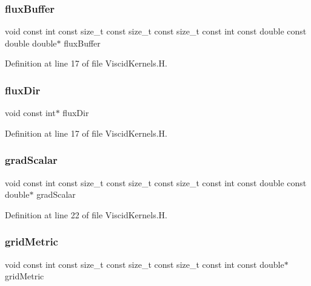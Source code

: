 \subsubsection{\texorpdfstring{flux\+Buffer}{fluxBuffer}}
{\footnotesize\ttfamily void const int const size\+\_\+t const size\+\_\+t const size\+\_\+t const int const double const double double$\ast$ flux\+Buffer}



Definition at line 17 of file Viscid\+Kernels.\+H.

\hypertarget{ViscidKernels_8H_a466b72ae195460a9c9f2d36373803dc5}{}\label{ViscidKernels_8H_a466b72ae195460a9c9f2d36373803dc5} 
\subsubsection{\texorpdfstring{flux\+Dir}{fluxDir}}
{\footnotesize\ttfamily void const int$\ast$ flux\+Dir}



Definition at line 17 of file Viscid\+Kernels.\+H.

\hypertarget{ViscidKernels_8H_a239db5332b411ca172b2f9bf4b0d92bf}{}\label{ViscidKernels_8H_a239db5332b411ca172b2f9bf4b0d92bf} 
\subsubsection{\texorpdfstring{grad\+Scalar}{gradScalar}}
{\footnotesize\ttfamily void const int const size\+\_\+t const size\+\_\+t const size\+\_\+t const int const double const double$\ast$ grad\+Scalar}



Definition at line 22 of file Viscid\+Kernels.\+H.

\hypertarget{ViscidKernels_8H_a40f73d0f458f6398fb217316165896c1}{}\label{ViscidKernels_8H_a40f73d0f458f6398fb217316165896c1} 
\subsubsection{\texorpdfstring{grid\+Metric}{gridMetric}}
{\footnotesize\ttfamily void const int const size\+\_\+t const size\+\_\+t const size\+\_\+t const int const double$\ast$ grid\+Metric}



